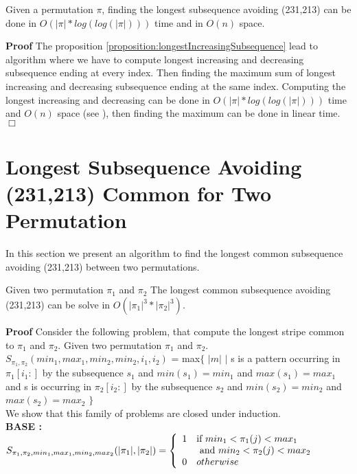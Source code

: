 \documentclass[a4paper]{llncs}
\newcommand{\ptext}{\pi}
\newcounter{num}
\begin{document}
	\begin{proposition}
	Given a permutation $\pi$, 
	finding the longest subsequence avoiding (231,213)
	can be done in $O(|\ptext|*log(log(|\ptext|)))$ time and in $O(n)$ space.	
	\end{proposition}
	
	\textbf{Proof} The proposition \ref{proposition:longestIncreasingSubsequence} lead to algorithm 
	where we have to compute longest increasing and decreasing subsequence ending at every index. Then finding the maximum sum of longest increasing and decreasing subsequence ending at the same index.
	Computing the longest increasing and decreasing can be done in $O(|\ptext|*log(log(|\ptext|)))$ time and $O(n)$ space (see \cite{Bespamyatnikh00enumeratinglongest}), then finding the maximum can be done in linear time.$\Box$\\



	\section{Longest Subsequence Avoiding \\(231,213) Common for Two Permutation}
	
	In this section we present an algorithm to find 
	the longest common subsequence avoiding (231,213) 
	between two permutations.\\

	\begin{proposition}
	Given two permutation $\pi_1$ and $\pi_2$
	The longest common subsequence
	avoiding (231,213) can be solve in $O(|\pi_1|^3*|\pi_2|^3)$.	
	\end{proposition}
	
	\textbf{Proof } Consider the following problem, 
	that compute the longest stripe common to $\pi_1$ and $\pi_2$.
	Given two permutation $\pi_1$ and $\pi_2$.\\
	
	$S_{\pi_1,\pi_2}(min_1,max_1,min_2,min_2,i_1,i_2)$
	= max$\{$ $|m|$ $|$ 
	s is a pattern occurring 
	in  $\pi_1[i_1:]$
	by the subsequence $s_1$ and $min(s_1)=min_1$ and $max(s_1)=max_1$
	and s is occurring
	in  $\pi_2[i_2:]$
	by the subsequence $s_2$ and $min(s_2)=min_2$ and $max(s_2)=max_2$	
	$\}$\\
	
	We show that this family of problems are closed under induction.\\


	\textbf{BASE :} \\
	$S_{\pi_1,\pi_2,min_1,max_1,min_2,max_2}(|\pi_1|,|\pi_2|) = \left\{ 
			\begin{array}{l l}
				1 & \text{if $min_1<\pi_1(j)<max_1$  
				}\\
				& \text{ and $min_2<\pi_2(j)<max_2$}\\
				0 & otherwise\\
			\end{array} \right. $\\	
\end{document}
